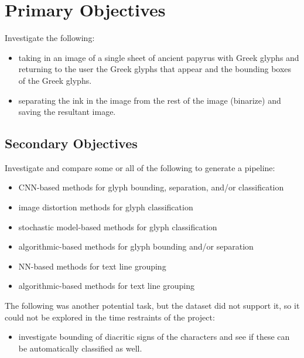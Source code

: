 \section{Primary Objectives}

Investigate the following:

\begin{itemize}
  \item taking in an image of a single sheet of ancient papyrus with Greek glyphs and returning to the user the Greek glyphs that appear and the bounding boxes of the Greek glyphs.
  \item separating the ink in the image from the rest of the image (binarize) and saving the resultant image.
\end{itemize}

\subsection{Secondary Objectives}

Investigate and compare some or all of the following to generate a pipeline:

\begin{itemize}
  \item CNN-based methods for glyph bounding, separation, and/or classification
  \item image distortion methods for glyph classification
  \item stochastic model-based methods for glyph classification
  \item algorithmic-based methods for glyph bounding and/or separation
  \item NN-based methods for text line grouping
  \item algorithmic-based methods for text line grouping
\end{itemize}

The following was another potential task, but the dataset did not support it, so it could not be explored in the time restraints of the project:

\begin{itemize}
  \item investigate bounding of diacritic signs of the characters and see if these can be automatically classified as well.
\end{itemize}
